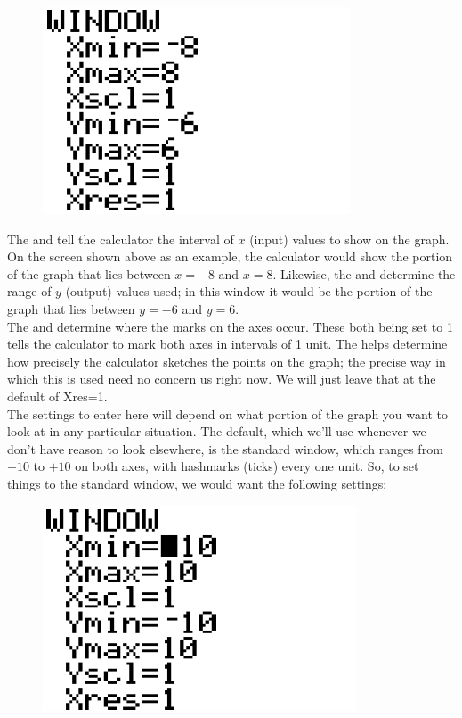 \begin{figure}[H]
	\centering
	\includegraphics[scale=1.0]{Sections/FunctionsandGraphsImages/Figure20.png}
\end{figure}

The  and  tell the calculator the interval of $x$ (input) values to show on the graph. On the screen shown above as an example, the calculator would show the portion of the graph that lies between $x=-8$ and $x=8$. Likewise, the  and  determine the range of $y$ (output) values used; in this window it would be the portion of the graph that lies between $y=-6$ and $y=6$.\\

The  and  determine where the marks on the axes occur. These both being set to 1 tells the calculator to mark both axes in intervals of 1 unit. The  helps determine how precisely the calculator sketches the points on the graph; the precise way in which this is used need no concern us right now. We will just leave that at the default of Xres=1.\\

The settings to enter here will depend on what portion of the graph you want to look at in any particular situation. The default, which we’ll use whenever we don’t have reason to look elsewhere, is the standard window, which ranges from $-10$ to $+10$ on both axes, with hashmarks (ticks) every one unit. So, to set things to the standard window, we would want the following settings:

\begin{figure}[H]
	\centering
	\includegraphics[scale=1.0]{Sections/FunctionsandGraphsImages/Figure21.png}
\end{figure}

